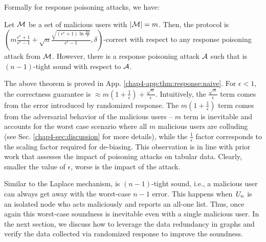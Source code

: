 Formally
for response poisoning attacks, we have:
\begin{thm}\label{chap4-thm:b3a2_hard} 
Let $\mathcal{M}$ be a set of malicious users with $|\mathcal{M}| = m$. Then, 
the \DegRRNaive{} protocol is $(m\frac{e^\epsilon+1}{e^\epsilon-1}+\sqrt{n}\frac{\sqrt{(e^\epsilon+1)\ln\frac{2n}{\delta}}}{e^\epsilon-1},\delta)$-correct with respect to any response poisoning attack from $\mathcal{M}$. However, there is a response poisoning attack $\mathcal{A}$ such that \DegRRNaive{} is $(n-1)$-tight sound with respect to $\mathcal{A}$.
\label{chap4-thm:response:naive}\end{thm}
The above theorem is proved in App. \ref{chap4-app:thm:response:naive}.
For $\epsilon < 1$, the correctness guarantee is $\approx m(1+\frac{1}{\epsilon})+\frac{\sqrt{n}}{\epsilon}$. Intuitively, the $\frac{\sqrt{n}}{\epsilon}$ term comes from the error introduced by randomized response. The $m(1+\frac{1}{\epsilon})$ term comes from the adversarial behavior of the malicious users -- $m$ term is inevitable and 
 accounts for the worst case scenario where all $m$ malicious users are colluding  (see Sec. \ref{chap4-sec:discussion}  for more details), while the $\frac{1}{\epsilon}$ factor corresponds to the scaling factor required for de-biasing. This observation is in line with prior work \cite{Cheu21} that assesses the impact of poisoning attacks on tabular data.  Clearly, smaller the value of $\epsilon$, worse is the impact of the attack.   %


Similar to the Laplace mechanism, \DegRRNaive{} is $(n-1)$-tight sound, i.e., a malicious user can always get away with the worst-case $n-1$ error. This happens when $\textit{U}_n$ is an isolated node who acts maliciously and reports an all-one list. Thus, once again this  worst-case soundness is inevitable even with a single malicious user.   In the next section, we discuss how to leverage the data redundancy in graphs and verify the data collected via randomized response to improve the soundness.



